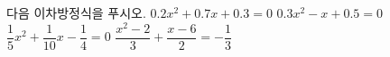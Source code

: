 다음 이차방정식을 푸시오.
 $0.2x^2+0.7x+0.3=0$
 $0.3x^2-x+0.5=0$
 $\dfrac{1}{5}x^2+\dfrac{1}{10}x-\dfrac{1}{4}=0$
 $\dfrac{x^2-2}{3}+\dfrac{x-6}{2}=-\dfrac{1}{3}$
